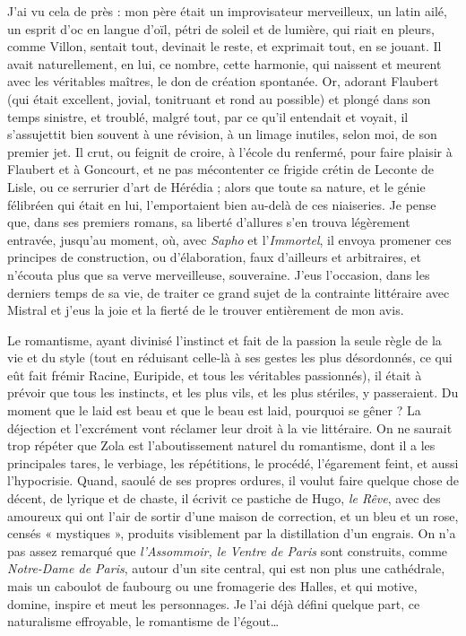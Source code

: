 \documentclass[french,twoside]{book} %
\begin{document}
J’ai vu cela de près : mon père était un improvisateur merveilleux, un latin ailé, un esprit d’oc en langue d’oïl, pétri de soleil et de lumière, qui riait en pleurs, comme Villon, sentait tout, devinait le reste, et exprimait tout, en se jouant. Il avait naturellement, en lui, ce nombre, cette harmonie, qui naissent et meurent avec les véritables maîtres, le don de création spontanée. Or, adorant Flaubert (qui était excellent, jovial, tonitruant et rond au possible) et plongé dans son temps sinistre, et troublé, malgré tout, par ce qu’il entendait et voyait, il s’assujettit bien souvent à une révision, à un limage inutiles, selon moi, de son premier jet. Il crut, ou feignit de croire, à l’école du renfermé, pour faire plaisir à Flaubert et à Goncourt, et ne pas mécontenter ce frigide crétin de Leconte de Lisle, ou ce serrurier d’art de Hérédia ; alors que toute sa nature, et le génie félibréen qui était en lui, l’emportaient bien au-delà de ces niaiseries. Je pense que, dans ses premiers romans, sa liberté d’allures s’en trouva légèrement entravée, jusqu’au moment, où, avec {\itshape Sapho} et l’{\itshape Immortel}, il envoya promener ces principes de construction, ou d’élaboration, faux d’ailleurs et arbitraires, et n’écouta plus que sa verve merveilleuse, souveraine. J’eus l’occasion, dans les derniers temps de sa vie, de traiter ce grand sujet de la contrainte littéraire avec Mistral et j’eus la joie et la fierté de le trouver entièrement de mon avis.\par
Le romantisme, ayant divinisé l’instinct et fait de la passion la seule règle de la vie et du style (tout en réduisant celle-là à ses gestes les plus désordonnés, ce qui eût fait frémir Racine, Euripide, et tous les véritables passionnés), il était à prévoir que tous les instincts, et les plus vils, et les plus stériles, y passeraient. Du moment que le laid est beau et que le beau est laid, pourquoi se gêner ? La déjection et l’excrément vont réclamer leur droit à la vie littéraire. On ne saurait trop répéter que Zola est l’aboutissement naturel du romantisme, dont il a les principales tares, le verbiage, les répétitions, le procédé, l’égarement feint, et aussi l’hypocrisie. Quand, saoulé de ses propres ordures, il voulut faire quelque chose de décent, de lyrique et de chaste, il écrivit ce pastiche de Hugo, {\itshape le Rêve}, avec des amoureux qui ont l’air de sortir d’une maison de correction, et un bleu et un rose, censés « mystiques », produits visiblement par la distillation d’un engrais. On n’a pas assez remarqué que {\itshape l’Assommoir, le Ventre de Paris} sont construits, comme {\itshape Notre-Dame de Paris}, autour d’un site central, qui est non plus une cathédrale, mais un caboulot de faubourg ou une fromagerie des Halles, et qui motive, domine, inspire et meut les personnages. Je l’ai déjà défini quelque part, ce naturalisme effroyable, le romantisme de l’égout…\par
\end{document}
